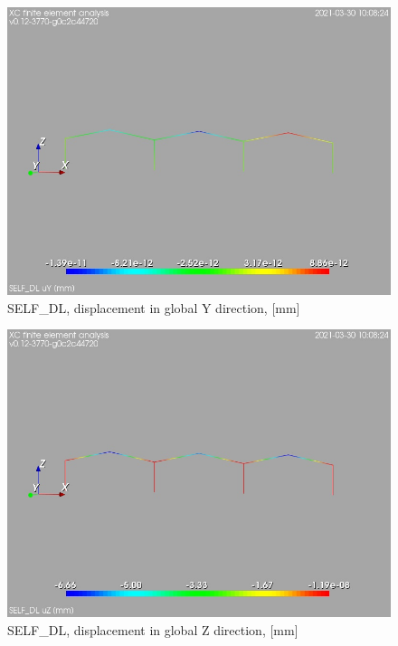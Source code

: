 \begin{figure}
\begin{center}
\includegraphics[width=\linewidth]{calc_results/sole_zeinali/text/graphics/resSimplLC/SELF_DLtotaluY}
\caption{SELF_DL, displacement in global Y direction, [mm]}
\end{center}
\end{figure}
\begin{figure}
\begin{center}
\includegraphics[width=\linewidth]{calc_results/sole_zeinali/text/graphics/resSimplLC/SELF_DLtotaluZ}
\caption{SELF_DL, displacement in global Z direction, [mm]}
\end{center}
\end{figure}
